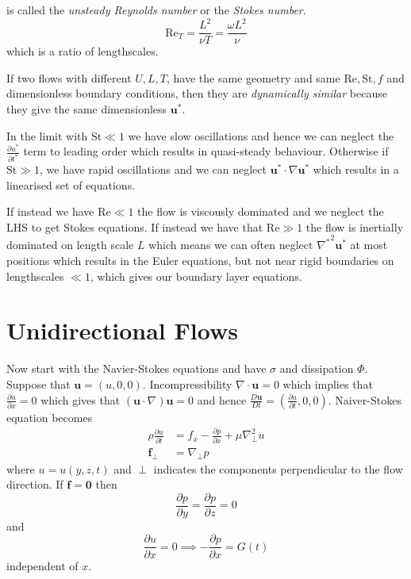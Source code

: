 \documentclass{article}
\begin{document}
is called the \textit{unsteady Reynolds number} or the \textit{Stokes number}.
\[
	\mathrm{Re}_T = \frac{L^2}{\nu T} = \frac{\omega L^2}{\nu}
\]
which is a ratio of lengthscales.
\par
If two flows with different $ U,L,T $, have the same geometry and same $ \mathrm{Re}, \mathrm{St}, f $ and dimensionless boundary conditions, then they are \textit{dynamically similar} because they give the same dimensionless $ \mathbf u^* $.\par
In the limit with $ \mathrm{St} \ll 1 $ we have slow oscillations and hence we can neglect the $ \frac{\partial u^*}{\partial t^*} $ term to leading order which results in quasi-steady behaviour. Otherwise if $ \mathrm{St} \gg 1 $, we have rapid oscillations and we can neglect $ \mathbf u^*\cdot\nabla \mathbf u^* $ which results in a linearised set of equations. 
\par
If instead we have $ \mathrm{Re} \ll 1 $ the flow is viscously dominated and we neglect the LHS to get Stokes equations. If instead we have that $ \mathrm{Re}\gg 1 $ the flow is inertially dominated on length scale $ L $ which means we can often neglect $ {\nabla^*}^2 \mathbf u^* $ at most positions which results in the Euler equations, but not near rigid boundaries on lengthscales $ \ll 1 $, which gives our boundary layer equations.
\section{Unidirectional Flows}
Now start with the Navier-Stokes equations and have $ \sigma $ and dissipation $ \Phi $. Suppose that $ \mathbf u = (u,0,0) $. Incompressibility $ \nabla\cdot\mathbf u= 0 $ which implies that $ \frac{\partial u}{\partial x} = 0 $ which gives that $ (\mathbf u\cdot\nabla) \mathbf u =0 $ and hence $ \frac{D\mathbf u}{Dt} = \left(\frac{\partial u}{\partial t},0,0\right) $. Naiver-Stokes equation becomes
\begin{align*}
	\rho \frac{\partial u}{\partial t} &= f_x - \frac{\partial p}{\partial x} + \mu \nabla^2_{\perp} u \\
	\mathbf f_\perp &= \nabla_\perp p
\end{align*}
where $ u = u(y,z,t) $ and $ \perp $ indicates the components perpendicular to the flow direction. If $ \mathbf f =\mathbf 0 $ then 
\[
	\frac{\partial p}{\partial y} = \frac{\partial p}{\partial z} = 0
\]
and 
\[
	\frac{\partial u}{\partial x} = 0 \implies - \frac{\partial p}{\partial x} = G(t)
\]
independent of $ x $.
\end{document}
